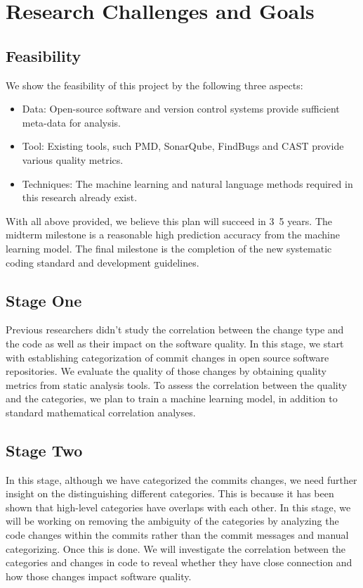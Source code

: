 \section{Research Challenges and Goals}
\label{sec:goal}

\subsection{Feasibility}
We show the feasibility of this project by the following three aspects:
\begin{itemize}
    \item Data: Open-source software and version control systems provide sufficient meta-data for analysis.
    \item Tool: Existing tools, such PMD, SonarQube, FindBugs and CAST provide various quality metrics.
    \item Techniques: The machine learning and natural language methods required in this research already exist.
\end{itemize}
With all above provided, we believe this plan will succeed in 3~5 years.
The midterm milestone is a reasonable high prediction accuracy from the machine learning model.
The final milestone is the completion of the new systematic coding standard and development guidelines.


\subsection{Stage One}
Previous researchers didn't study the correlation between the change type and the code as well as their impact on the software quality. 
In this stage, we start with establishing categorization of commit changes in open source software repositories.
We evaluate the quality of those changes by obtaining quality metrics from static analysis tools.
To assess the correlation between the quality and the categories, we plan to train a machine learning model, in addition to standard mathematical correlation analyses.

\subsection{Stage Two}
In this stage, although we have categorized the commits changes, we need further insight on the distinguishing different categories.
This is because it has been shown that high-level categories have overlaps with each other.
In this stage, we will be working on removing the ambiguity of the categories by analyzing the code changes within the commits rather than the commit messages and manual categorizing.
Once this is done. We will investigate the correlation between the categories and changes in code to reveal whether they have close connection and how those changes impact software quality.

